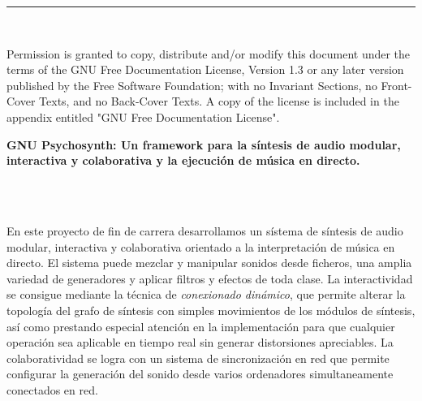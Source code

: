 



\thispagestyle{empty}
\cleardoublepage
\thispagestyle{empty}



\thispagestyle{empty}
\noindent\rule[-1ex]{\textwidth}{2pt}\\[4.5ex]
\vfill

\vspace{.5cm}

\noindent Permission is granted to copy, distribute and/or modify this
document under the terms of the GNU Free Documentation License,
Version 1.3 or any later version published by the Free Software
Foundation; with no Invariant Sections, no Front-Cover Texts, and no
Back-Cover Texts.  A copy of the license is included in the appendix
entitled "GNU Free Documentation License".


\clearpage
\thispagestyle{empty}
\begin{center}
{\large\bfseries GNU Psychosynth: Un framework para la síntesis de audio modular, interactiva y colaborativa y la ejecución de música en directo.}\\
\end{center}
\begin{center}
\myName
\end{center}
\\
\vspace{0.7cm}

\\
En este proyecto de fin de carrera desarrollamos un sístema de
síntesis de audio modular, interactiva y colaborativa orientado a la
interpretación de música en directo. El sistema puede mezclar y
manipular sonidos desde ficheros, una amplia variedad de generadores y
aplicar filtros y efectos de toda clase. La interactividad se consigue
mediante la técnica de \emph{conexionado dinámico}, que permite
alterar la topología del grafo de síntesis con simples movimientos de
los módulos de síntesis, así como prestando especial atención en la
implementación para que cualquier operación sea aplicable en tiempo
real sin generar distorsiones apreciables. La colaboratividad se logra
con un sistema de sincronización en red que permite configurar la
generación del sonido desde varios ordenadores simultaneamente
conectados en red.

